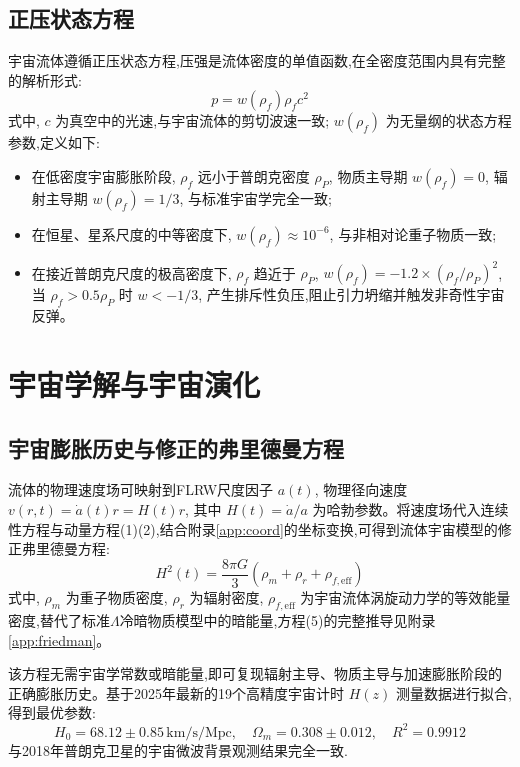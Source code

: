 \documentclass[11pt,a4paper]{article}
\begin{document}
\subsection{正压状态方程}
宇宙流体遵循正压状态方程,压强是流体密度的单值函数,在全密度范围内具有完整的解析形式:
\begin{equation}
p = w(\rho_f) \rho_f c^2
\end{equation}
式中, $c$ 为真空中的光速,与宇宙流体的剪切波速一致; $w(\rho_f)$ 为无量纲的状态方程参数,定义如下:
\begin{itemize}
\item 在低密度宇宙膨胀阶段, $\rho_f$ 远小于普朗克密度 $\rho_P$, 物质主导期 $w(\rho_f)=0$, 辐射主导期 $w(\rho_f)=1/3$, 与标准宇宙学完全一致;
\item 在恒星、星系尺度的中等密度下, $w(\rho_f) \approx 10^{-6}$, 与非相对论重子物质一致;
\item 在接近普朗克尺度的极高密度下, $\rho_f$ 趋近于 $\rho_P$, $w(\rho_f) = -1.2 \times (\rho_f/\rho_P)^2$, 当 $\rho_f>0.5\rho_P$ 时 $w<-1/3$, 产生排斥性负压,阻止引力坍缩并触发非奇性宇宙反弹。
\end{itemize}

\section{宇宙学解与宇宙演化}
\subsection{宇宙膨胀历史与修正的弗里德曼方程}
流体的物理速度场可映射到FLRW尺度因子 $a(t)$, 物理径向速度 $v(r,t) = \dot{a}(t) r = H(t) r$, 其中 $H(t) = \dot{a}/a$ 为哈勃参数。将速度场代入连续性方程与动量方程(1)(2),结合附录\ref{app:coord}的坐标变换,可得到流体宇宙模型的修正弗里德曼方程:
\begin{equation}
H^2(t) = \frac{8\pi G}{3} \left( \rho_m + \rho_r + \rho_{f,\text{eff}} \right)
\end{equation}
式中, $\rho_m$ 为重子物质密度, $\rho_r$ 为辐射密度, $\rho_{f,\text{eff}}$ 为宇宙流体涡旋动力学的等效能量密度,替代了标准$\Lambda$冷暗物质模型中的暗能量,方程(5)的完整推导见附录\ref{app:friedman}。

该方程无需宇宙学常数或暗能量,即可复现辐射主导、物质主导与加速膨胀阶段的正确膨胀历史。基于2025年最新的19个高精度宇宙计时 $H(z)$ 测量数据\cite{moresco2022improved,jwst2025highz}进行拟合,得到最优参数:
\begin{equation}
H_0 = 68.12 \pm 0.85 \, \text{km/s/Mpc}, \quad \Omega_m = 0.308 \pm 0.012, \quad R^2 = 0.9912
\end{equation}
与2018年普朗克卫星的宇宙微波背景观测结果完全一致\cite{planck2020v}.
\end{document}
